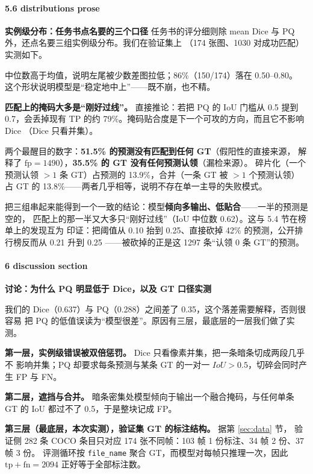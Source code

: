 \documentclass{article}
\begin{document}
\paragraph{5.6 distributions prose}
\textbf{实例级分布：任务书点名要的三个口径}
任务书的评分细则除 mean Dice 与 PQ 外，还点名要三组实例级分布。我们在验证集上
（174 张图、1030 对成功匹配）实测如下。



中位数高于均值，说明左尾被少数差图拉低；86\%（150/174）落在 0.50--0.80。
这个形状说明模型是“稳定地中上”——既不崩，也不精。



\textbf{匹配上的掩码大多是“刚好过线”。} 直接推论：若把 PQ 的 IoU 门槛从 0.5 提到
0.7，会丢掉现有 TP 的约 79\%。掩码贴合度是下一个可攻的方向，而且它不影响 Dice
（Dice 只看并集）。



两个最醒目的数字：\textbf{51.5\% 的预测没有匹配到任何 GT}（假阳性的直接来源，
解释了 $\mathrm{fp}=1490$），\textbf{35.5\% 的 GT 没有任何预测认领}（漏检来源）。
碎片化（一个预测认领 $>1$ 条 GT）占预测的 13.9\%，合并（一条 GT 被 $>1$ 个预测认领）
占 GT 的 13.8\%——两者几乎相等，说明不存在单一主导的失败模式。

把三组串起来能得到一个一致的结论：模型\textbf{倾向多输出、低贴合}——一半的预测是空的，
匹配上的那一半又大多只“刚好过线”（IoU 中位数 0.62）。这与 5.4 节在榜单上的发现互为
印证：把阈值从 0.10 抬到 0.25、直接砍掉 42\% 的预测，公开排行榜反而从 0.21 升到 0.25
——被砍掉的正是这 1297 条“认领 0 条 GT”的预测。

\paragraph{6 discussion section}
\textbf{讨论：为什么 PQ 明显低于 Dice，以及 GT 口径实测}

我们的 Dice（0.637）与 PQ（0.288）之间差了 0.35，这个落差需要解释，否则很容易
把 PQ 的低值误读为“模型很差”。原因有三层，最底层的一层我们做了实测。

\textbf{第一层，实例级错误被双倍惩罚。} Dice 只看像素并集，把一条暗条切成两段几乎不
影响并集；PQ 却要求每条预测与某条 GT 的一对一 $IoU>0.5$，切碎会同时产生 FP 与 FN。

\textbf{第二层，遮挡与合并。} 暗条密集处模型倾向于输出一个融合掩码，与任何单条 GT
的 IoU 都过不了 0.5，于是整块记成 FP。

\textbf{第三层（最底层，本次实测），验证集 GT 的标注结构。} 据第 \ref{sec:data} 节，
验证侧 282 条 COCO 条目只对应 174 张不同帧：103 帧 1 份标注、34 帧 2 份、37 帧 3 份。
评测循环按 \texttt{file\_name} 聚合 GT，而模型对每帧只推理一次，因此
$\mathrm{tp}+\mathrm{fn}=2094$ 正好等于全部标注数。
\end{document}
